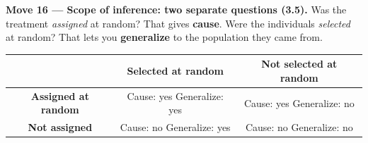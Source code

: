 \documentclass[12pt]{article}
\begin{document}
\vspace{5pt}
\boxguard[10]
\textbf{Move 16 --- Scope of inference: two separate questions (3.5).} Was the treatment
\emph{assigned} at random? That gives \textbf{cause}. Were the individuals \emph{selected} at
random? That lets you \textbf{generalize} to the population they came from.

\vspace{3pt}
{\centering\footnotesize
\renewcommand{\arraystretch}{1.25}
\begin{tabular}{|c|c|c|}
\hline
 & \cellcolor{sky}\textbf{Selected at random} & \cellcolor{sky}\textbf{Not selected at random} \\
\hline
\cellcolor{sky}\textbf{Assigned at random} & Cause: yes \quad Generalize: yes & Cause: yes \quad Generalize: no \\
\hline
\cellcolor{sky}\textbf{Not assigned} & Cause: no \quad Generalize: yes & Cause: no \quad Generalize: no \\
\hline
\end{tabular}\par}
\normalsize
\end{document}
